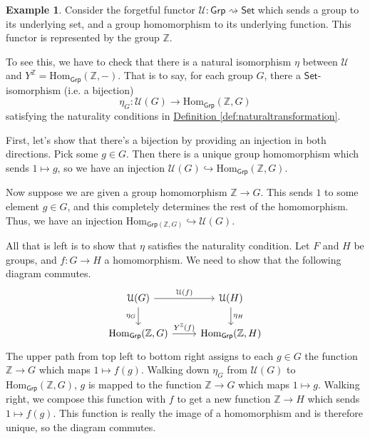 \documentclass[a4paper]{report}
\newcommand{\Z}{\mathbb{Z}}
\newcommand{\Hom}{\mathrm{Hom}}
\theoremstyle{definition}
\newtheorem{example}{Example}[section]
\theoremstyle{plain}
\theoremstyle{remark}
\begin{document}
\begin{example}
  Consider the forgetful functor $\mathcal{U}\colon \mathsf{Grp} \rightsquigarrow \mathsf{Set}$ which sends a group to its underlying set, and a group homomorphism to its underlying function. This functor is represented by the group $\Z$.

  To see this, we have to check that there is a natural isomorphism $\eta$ between $\mathcal{U}$ and $Y^{\Z} = \Hom_{\mathsf{Grp}}(\Z, -)$. That is to say, for each group $G$, there a $\mathsf{Set}$-isomorphism (i.e. a bijection)
  \begin{equation*}
    \eta_{G}\colon \mathcal{U}(G) \to \Hom_{\mathsf{Grp}}(\Z, G)
  \end{equation*}
  satisfying the naturality conditions in \hyperref[def:naturaltransformation]{Definition \ref*{def:naturaltransformation}}.

  First, let's show that there's a bijection by providing an injection in both directions. Pick some $g \in G$. Then there is a unique group homomorphism which sends $1 \mapsto g$, so we have an injection $\mathcal{U}(G) \hookrightarrow \Hom_{\mathsf{Grp}}(\Z, G)$.

  Now suppose we are given a group homomorphism $\Z \to G$. This sends $1$ to some element $g \in G$, and this completely determines the rest of the homomorphism. Thus, we have an injection $\Hom_{\mathsf{Grp}(\Z, G)} \hookrightarrow \mathcal{U}(G)$.

  All that is left is to show that $\eta$ satisfies the naturality condition. Let $F$ and $H$ be groups, and $f\colon G \to H$ a homomorphism. We need to show that the following diagram commutes.
  \begin{equation*}
    \begin{tikzcd}
      \mathcal{U}(G)
      \arrow[r, "\mathcal{U}(f)"]
      \arrow[d, swap, "\eta_{G}"]
      & \mathcal{U}(H)
      \arrow[d, "\eta_{H}"]
      \\
      \Hom_{\mathsf{Grp}}(\Z, G)
      \arrow[r, "Y^{\Z}(f)"]
      & \Hom_{\mathsf{Grp}}(\Z, H)
    \end{tikzcd}
  \end{equation*}
  The upper path from top left to bottom right assigns to each $g \in G$ the function $\Z \to G$ which maps $1 \mapsto f(g)$. Walking down $\eta_{G}$ from $\mathcal{U}(G)$ to $\Hom_{\mathsf{Grp}}(\Z, G)$, $g$ is mapped to the function $\Z \to G$ which maps $1 \mapsto g$. Walking right, we compose this function with $f$ to get a new function $\Z \to H$ which sends $1 \mapsto f(g)$. This function is really the image of a homomorphism and is therefore unique, so the diagram commutes.
\end{example}
\end{document}
